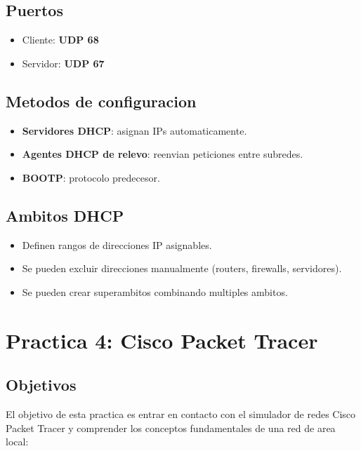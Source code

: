 \subsection{Puertos}

\begin{itemize}
    \item Cliente: \textbf{UDP 68}
    \item Servidor: \textbf{UDP 67}
\end{itemize}

\subsection{Metodos de configuracion}

\begin{itemize}
    \item \textbf{Servidores DHCP}: asignan IPs automaticamente.
    \item \textbf{Agentes DHCP de relevo}: reenvian peticiones entre subredes.
    \item \textbf{BOOTP}: protocolo predecesor.
\end{itemize}

\subsection{Ambitos DHCP}

\begin{itemize}
    \item Definen rangos de direcciones IP asignables.
    \item Se pueden excluir direcciones manualmente (routers, firewalls, servidores).
    \item Se pueden crear superambitos combinando multiples ambitos.
\end{itemize}


\section{Practica 4: Cisco Packet Tracer}
\label{sec:practica4}

\subsection{Objetivos}

El objetivo de esta practica es entrar en contacto con el simulador de redes
Cisco Packet Tracer y comprender los conceptos fundamentales de una red de
area local:

